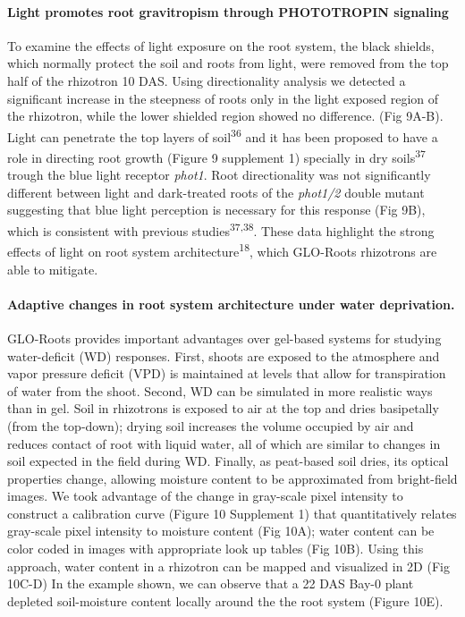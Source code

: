 \documentclass[]{article}
\begin{document}
\paragraph{Light promotes root gravitropism through PHOTOTROPIN
signaling}\label{light-promotes-root-gravitropism-through-phototropin-signaling}

To examine the effects of light exposure on the root system, the black
shields, which normally protect the soil and roots from light, were
removed from the top half of the rhizotron 10 DAS. Using directionality
analysis we detected a significant increase in the steepness of roots
only in the light exposed region of the rhizotron, while the lower
shielded region showed no difference. (Fig 9A-B). Light can penetrate
the top layers of soil\textsuperscript{36} and it has been proposed to
have a role in directing root growth (Figure 9 supplement 1) specially
in dry soils\textsuperscript{37} trough the blue light receptor
\emph{phot1}. Root directionality was not significantly different
between light and dark-treated roots of the \emph{phot1/2} double mutant
suggesting that blue light perception is necessary for this response
(Fig 9B), which is consistent with previous
studies\textsuperscript{37,38}. These data highlight the strong effects
of light on root system architecture\textsuperscript{18}, which
GLO-Roots rhizotrons are able to mitigate.

\paragraph{Adaptive changes in root system architecture under water
deprivation.}\label{adaptive-changes-in-root-system-architecture-under-water-deprivation.}

GLO-Roots provides important advantages over gel-based systems for
studying water-deficit (WD) responses. First, shoots are exposed to the
atmosphere and vapor pressure deficit (VPD) is maintained at levels that
allow for transpiration of water from the shoot. Second, WD can be
simulated in more realistic ways than in gel. Soil in rhizotrons is
exposed to air at the top and dries basipetally (from the top-down);
drying soil increases the volume occupied by air and reduces contact of
root with liquid water, all of which are similar to changes in soil
expected in the field during WD. Finally, as peat-based soil dries, its
optical properties change, allowing moisture content to be approximated
from bright-field images. We took advantage of the change in gray-scale
pixel intensity to construct a calibration curve (Figure 10 Supplement
1) that quantitatively relates gray-scale pixel intensity to moisture
content (Fig 10A); water content can be color coded in images with
appropriate look up tables (Fig 10B). Using this approach, water content
in a rhizotron can be mapped and visualized in 2D (Fig 10C-D) In the
example shown, we can observe that a 22 DAS Bay-0 plant depleted
soil-moisture content locally around the the root system (Figure 10E).
\end{document}
